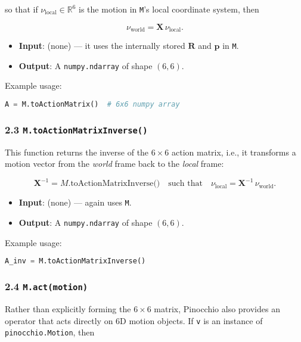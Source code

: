 \documentclass[10pt]{article}
\begin{document}
so that if \(\nu_{\text{local}} \in \mathbb{R}^6\) is the motion in \texttt{M}'s local coordinate system, then

\[
\nu_{\text{world}} = \mathbf{X}\,\nu_{\text{local}}.
\]

\begin{itemize}
  \item \textbf{Input}: (none) --- it uses the internally stored \(\mathbf{R}\) and \(\mathbf{p}\) in \texttt{M}.
  \item \textbf{Output}: A \texttt{numpy.ndarray} of shape \((6,6)\).
\end{itemize}

Example usage:
\begin{lstlisting}[language=Python]
A = M.toActionMatrix()  # 6x6 numpy array
\end{lstlisting}

\subsubsection*{2.3 \texttt{M.toActionMatrixInverse()}}

This function returns the inverse of the \(6\times6\) action matrix, i.e., it transforms a motion vector from the \emph{world} frame back to the \emph{local} frame:

\[
\mathbf{X}^{-1} = M.\text{toActionMatrixInverse()}
\quad \text{such that} \quad
\nu_{\text{local}} = \mathbf{X}^{-1} \,\nu_{\text{world}}.
\]

\begin{itemize}
  \item \textbf{Input}: (none) --- again uses \texttt{M}.
  \item \textbf{Output}: A \texttt{numpy.ndarray} of shape \((6,6)\).
\end{itemize}

Example usage:
\begin{lstlisting}[language=Python]
A_inv = M.toActionMatrixInverse()
\end{lstlisting}

\subsubsection*{2.4 \texttt{M.act(motion)}}

Rather than explicitly forming the \(6\times6\) matrix, Pinocchio also provides an operator that acts directly on 6D motion objects. If \texttt{v} is an instance of \texttt{pinocchio.Motion}, then
\end{document}
